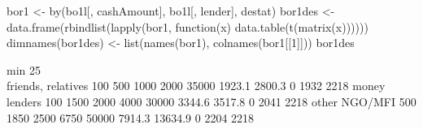 \begin{Schunk}
\begin{Sinput}
bor1 <- by(bo1l[, cashAmount], bo1l[, lender], destat)
bor1des <- data.frame(rbindlist(lapply(bor1, function(x) data.table(t(matrix(x))))))
dimnames(bor1des) <- list(names(bor1), colnames(bor1[[1]]))
bor1des
\end{Sinput}
\begin{Soutput}
                   min 25\\% median 75\\%   max   mean     std 0s  NAs    n
friends, relatives 100   500   1000  2000 35000 1923.1  2800.3  0 1932 2218
money lenders      100  1500   2000  4000 30000 3344.6  3517.8  0 2041 2218
other NGO/MFI      500  1850   2500  6750 50000 7914.3 13634.9  0 2204 2218
\end{Soutput}
\end{Schunk}

